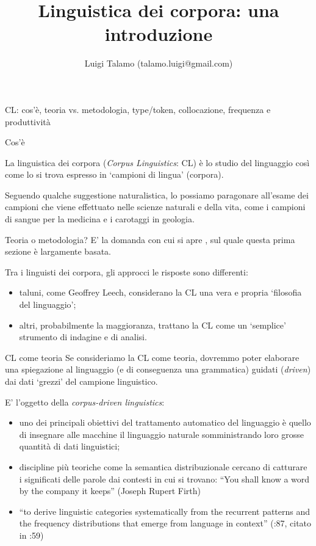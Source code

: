 \documentclass[pdf]{prosper}
\title{Linguistica dei corpora: una introduzione}
\author{Luigi Talamo (talamo.luigi@gmail.com)}
\begin{document}
\maketitle

\begin{tsectionandpart}{CL: cos'è, teoria vs. metodologia, type/token, collocazione, frequenza e produttività}

\begin{slide}{Cos'è}

La linguistica dei corpora ({\it Corpus Linguistics}: CL) è lo studio del linguaggio così come lo si trova espresso in `campioni di lingua' (corpora).

Seguendo qualche suggestione naturalistica, lo possiamo paragonare all'esame dei campioni che viene effettuato nelle scienze naturali e della vita, come i campioni di sangue per la medicina e i carotaggi in geologia.

\end{slide}

\begin{slide}{Teoria o metodologia?}
	E' la domanda con cui si apre \citealt{Gries2009}, sul quale questa prima sezione è largamente basata.

Tra i linguisti dei corpora, gli approcci le risposte sono differenti:

\begin{itemize}
\item taluni, come Geoffrey Leech, considerano la CL una vera e propria `filosofia del linguaggio';
\item altri, probabilmente la maggioranza, trattano la CL come un `semplice' strumento di indagine e di analisi.
\end{itemize}

\end{slide}

\begin{slide}{CL come teoria}
Se consideriamo la CL come teoria, dovremmo poter elaborare una spiegazione al linguaggio (e di conseguenza una grammatica) guidati ({\it driven}) dai dati `grezzi' del campione linguistico.

E' l'oggetto della {\it corpus-driven linguistics}: 

\begin{itemize}
\item uno dei principali obiettivi del trattamento automatico del linguaggio è quello di insegnare alle macchine il linguaggio naturale somministrando loro grosse quantità di dati linguistici;
\item discipline più teoriche come la semantica distribuzionale cercano di catturare i significati delle parole dai contesti in cui si trovano: ``You shall know a word by the company it keeps'' (Joseph Rupert Firth)
\item ``to derive linguistic categories systematically from the recurrent patterns and the frequency distributions that emerge from language in context'' (\citealt{Togninibonelli2001}:87, citato in \citealt{JensetMcgillivray2017}:59)
\end{itemize}


\end{slide}
\end{tsectionandpart}
\end{document}
